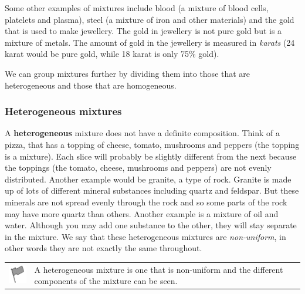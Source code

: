       \label{m38708*id62689}Some other examples of mixtures include blood (a mixture of blood cells, platelets and plasma), steel (a mixture of iron and other materials) and the gold that is used to make jewellery. The gold in jewellery is not pure gold but is a mixture of metals. The amount of gold in the jewellery is measured in \textsl{karats} (24 karat would be pure gold, while 18 karat is only 75\% gold).\par 
      \label{m38708*id62700}We can group mixtures further by dividing them into those that are heterogeneous and those that are homogeneous.\par 
      \label{m38708*uid5}
            \subsubsection{ Heterogeneous mixtures}
            \nopagebreak
        \label{m38708*id62715}A \textbf{heterogeneous} mixture does not have a definite composition. Think of a pizza, that has a topping of cheese, tomato, mushrooms and peppers (the topping is a mixture). Each slice will probably be slightly different from the next because the toppings (the tomato, cheese, mushrooms and peppers) are not evenly distributed. Another example would be granite, a type of rock. Granite is made up of lots of different mineral substances including quartz and feldspar. But these minerals are not spread evenly through the rock and so some parts of the rock may have more quartz than others. Another example is a mixture of oil and water. Although you may add one substance to the other, they will stay separate in the mixture. We say that these heterogeneous mixtures are \textsl{non-uniform}, in other words they are not exactly the same throughout.\par 
\label{m38708*fhsst!!!underscore!!!id89}\begin{definition}
	  \begin{tabular*}{15 cm}{m{15 mm}m{}}
	\hspace*{-50pt}  \includegraphics[width=0.5in]{col11305.imgs/psflag2.png}   & \Definition{   \label{id2405839}\textbf{ Heterogeneous mixture }} { \label{m38708*meaningfhsst!!!underscore!!!id89}
        A heterogeneous mixture is one that is non-uniform and the different components of the mixture can be seen.
         } 
      \end{tabular*}
      \end{definition}
      \label{m38708*uid6}

